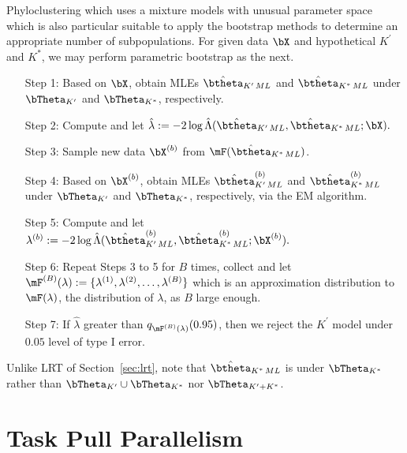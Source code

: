Phyloclustering which uses a mixture models with unusual parameter space
which is also particular suitable to apply the bootstrap methods to determine
an appropriate number of subpopulations.
For given data $\bX$ and hypothetical $K^\prime$ and $K^*$,
we may perform parametric bootstrap as the next.
\begin{enumerate}
\item[Step 1:]
Based on $\bX$,
obtain MLEs $\hat{\btheta}_{K^\prime\,ML}$ and $\hat{\btheta}_{K^*\,ML}$
under $\bTheta_{K^\prime}$ and $\bTheta_{K^*}$, respectively.

\item[Step 2:]
Compute and let
$
  \hat{\lambda} :=
  -2\log \hat{\Lambda}
  (\hat{\btheta}_{K^\prime\,ML},
   \hat{\btheta}_{K^*\,ML}; \bX).
$

\item[Step 3:]
Sample new data $\bX^{(b)}$ from $\mF(\hat{\btheta}_{K^*\,ML})$.

\item[Step 4:]
Based on $\bX^{(b)}$,
obtain MLEs $\hat{\btheta}^{(b)}_{K^\prime\,ML}$ and
$\hat{\btheta}^{(b)}_{K^*\,ML}$
under $\bTheta_{K^\prime}$ and $\bTheta_{K^*}$, respectively,
via the EM algorithm.

\item[Step 5:]
Compute and let
$
  \lambda^{(b)} :=
  -2\log \hat{\Lambda}
  (\hat{\btheta}^{(b)}_{K^\prime\,ML},
   \hat{\btheta}^{(b)}_{K^*\,ML}; \bX^{(b)}).
$

\item[Step 6:]
Repeat Steps 3 to 5 for $B$ times, collect and let
$\mF^{(B)}(\lambda) := \{\lambda^{(1)}, \lambda^{(2)}, \ldots, \lambda^{(B)}\}$
which is an approximation distribution to $\mF(\lambda)$,
the distribution of $\lambda$, as $B$ large enough.

\item[Step 7:]
If $\hat{\lambda}$ greater than $q_{\mF^{(B)}(\lambda)}(0.95)$, then
we reject the $K^\prime$ model under $0.05$ level of type I error.

\end{enumerate}
Unlike LRT of Section~\ref{sec:lrt}, note that
$\hat{\btheta}_{K^*\,ML}$ is under $\bTheta_{K^*}$ rather than
$\bTheta_{K^\prime} \cup \bTheta_{K^*}$ nor $\bTheta_{K^\prime + K^*}$.




\section{Task Pull Parallelism}
\label{sec:task_pull}

